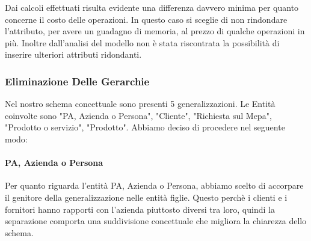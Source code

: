 \begin{table}[H]
\centering
\caption{Costo Operazioni senza Ridondanza}
\label{my-label}
\end{table}

\newline
Dai calcoli effettuati risulta evidente una differenza davvero minima per quanto concerne il costo delle operazioni. In questo caso si sceglie di non rindondare l'attributo, per avere un guadagno di memoria, al prezzo di qualche operazioni in più.
\newline
Inoltre dall'analisi del modello non è stata riscontrata la possibilità di inserire ulteriori attributi ridondanti.


\newpage
\subsubsection{Eliminazione Delle Gerarchie}

Nel nostro schema concettuale sono presenti 5 generalizzazioni. Le Entità coinvolte sono "PA, Azienda o Persona", "Cliente", "Richiesta sul Mepa", "Prodotto o servizio", "Prodotto".
\newline
Abbiamo deciso di procedere nel seguente modo:

\paragraph{PA, Azienda o Persona}
Per quanto riguarda l'entità PA, Azienda o Persona, abbiamo scelto di accorpare il genitore della generalizzazione nelle entità figlie. Questo perchè i clienti e i fornitori hanno rapporti con l'azienda piuttosto diversi tra loro, quindi la separazione comporta una suddivisione concettuale che migliora la chiarezza dello schema.
